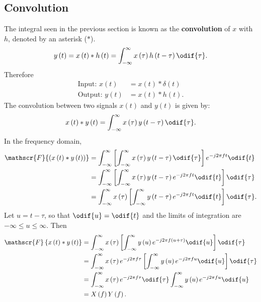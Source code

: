 \documentclass{article}
\begin{document}
\subsection{Convolution}
The integral seen in the previous section is known as the
\textbf{convolution} of \(x\) with \(h\), denoted by an asterisk
(\(\ast\)).
\begin{equation*}
    y\left( t \right) = x\left( t \right) * h\left( t \right) = \int_{-\infty}^\infty x\left( \tau \right) h\left( t - \tau \right) \odif{\tau}.
\end{equation*}
Therefore
\begin{align*}
    \text{Input: } x\left( t \right)  & = x\left( t \right) * \delta\left( t \right) \\
    \text{Output: } y\left( t \right) & = x\left( t \right) * h\left( t \right).
\end{align*}
The convolution between two signals \(x\left( t \right)\) and \(y\left( t \right)\) is given by:
\begin{equation*}
    x\left( t \right) \ast y\left( t \right) = \int_{-\infty}^\infty x\left( \tau \right) y\left( t - \tau \right) \odif{\tau}.
\end{equation*}
In the frequency domain,
\begin{align*}
    \mathscr{F}{\left( x\left( t \right) \ast y\left( t \right) \right)} & = \int_{-\infty}^\infty \left[ \int_{-\infty}^\infty x\left( \tau \right) y\left( t - \tau \right) \odif{\tau} \right] e^{-j 2 \pi f t} \odif{t}  \\
                                                                         & = \int_{-\infty}^\infty \left[ \int_{-\infty}^\infty x\left( \tau \right) y\left( t - \tau \right) e^{-j 2 \pi f t} \odif{t} \right] \odif{\tau}  \\
                                                                         & = \int_{-\infty}^\infty x\left( \tau \right) \left[ \int_{-\infty}^\infty y\left( t - \tau \right) e^{-j 2 \pi f t} \odif{t} \right] \odif{\tau}.
\end{align*}
Let \(u = t - \tau\), so that \(\odif{u} = \odif{t}\) and the limits of integration are \(-\infty \leq u \leq \infty\).
Then
\begin{align*}
    \mathscr{F}\left\{ x\left( t \right) \ast y\left( t \right) \right\} & = \int_{-\infty}^\infty x\left( \tau \right) \left[ \int_{-\infty}^\infty y\left( u \right) e^{-j 2 \pi f \left( u + \tau \right)} \odif{u} \right] \odif{\tau} \\
                                                                         & = \int_{-\infty}^\infty x\left( \tau \right) e^{-j 2 \pi f \tau} \left[ \int_{-\infty}^\infty y\left( u \right) e^{-j 2 \pi f u} \odif{u} \right] \odif{\tau}   \\
                                                                         & = \int_{-\infty}^\infty x\left( \tau \right) e^{-j 2 \pi f \tau} \odif{\tau} \int_{-\infty}^\infty y\left( u \right) e^{-j 2 \pi f u} \odif{u}                  \\
                                                                         & = X\left( f \right) Y\left( f \right).
\end{align*}
\end{document}

